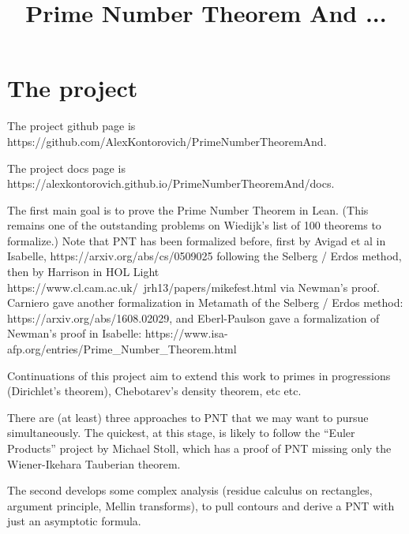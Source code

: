 \usepackage{amsmath, amsthm}

\theoremstyle{definition}
\newtheorem{definition}{Definition}
\newtheorem{theorem}{Theorem}
\newtheorem{proposition}{Proposition}
\newtheorem{lemma}{Lemma}
\newtheorem{corollary}{Corollary}

\title{Prime Number Theorem And ...}

\newcommand{\eps}{\epsilon}

\newcommand{\R}{\mathbb{R}}
\newcommand{\Q}{\mathbb{Q}}
\newcommand{\C}{\mathbb{C}}
\newcommand{\Z}{\mathbb{Z}}
\newcommand{\N}{\mathbb{N}}



\maketitle

\chapter{The project}

The project github page is https://github.com/AlexKontorovich/PrimeNumberTheoremAnd.

The project docs page is https://alexkontorovich.github.io/PrimeNumberTheoremAnd/docs.

The first main goal is to prove the Prime Number Theorem in Lean.
(This remains one of the outstanding problems on Wiedijk's list of 100 theorems to formalize.)
Note that PNT has been formalized before, first by Avigad et al in Isabelle,
https://arxiv.org/abs/cs/0509025
following the Selberg / Erdos method, then
by Harrison in HOL Light
https://www.cl.cam.ac.uk/~jrh13/papers/mikefest.html
via Newman's proof.
Carniero gave another formalization in Metamath of the Selberg / Erdos method:
https://arxiv.org/abs/1608.02029,
and Eberl-Paulson gave a formalization of Newman's proof in Isabelle:
https://www.isa-afp.org/entries/Prime\_Number\_Theorem.html

Continuations of this project aim to extend
this work to primes in progressions (Dirichlet's theorem), Chebotarev's density theorem, etc
etc.

There are (at least) three approaches to PNT that we may want to pursue simultaneously. The quickest, at this stage, is likely to
follow
 the ``Euler Products'' project by Michael Stoll, which has a proof of PNT missing only the Wiener-Ikehara Tauberian theorem.

The second develops some complex analysis (residue calculus on rectangles, argument principle, Mellin transforms), to pull contours and derive a PNT with just an asymptotic formula.

